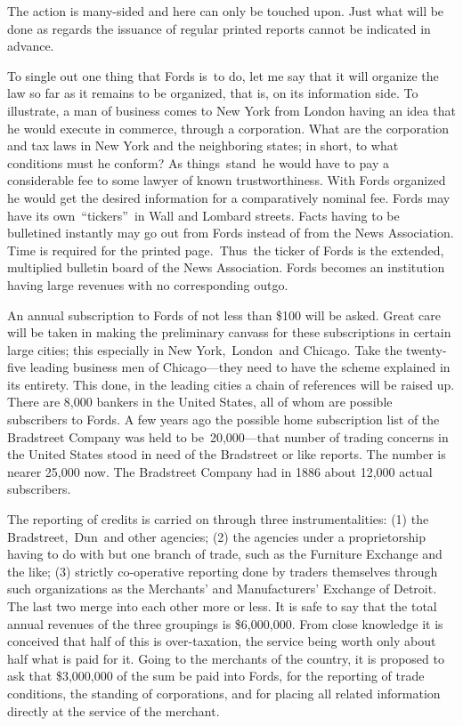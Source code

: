 \documentclass[openany,nobib]{tufte-book}
\begin{document}
The action is many-sided and here can only be touched upon. Just what
will be done as regards the issuance of regular printed reports cannot
be indicated in advance.~

To single out one thing that Fords is~to do, let me say that it will
organize the law so far as it remains to be organized, that is, on its
information side. To illustrate, a man of business comes to New York
from London having an idea that he would execute in commerce, through a
corporation. What are the corporation and tax laws in New York and the
neighboring states; in short, to what conditions must he conform? As
things~stand~he would have to pay a considerable fee to some lawyer of
known trustworthiness. With Fords organized he would get the desired
information for a comparatively nominal fee. Fords may have its
own~``tickers''~in Wall and Lombard streets. Facts having to be
bulletined instantly may go out from Fords instead of from the News
Association. Time is required for the printed page.~Thus~the ticker of
Fords is the extended, multiplied bulletin board of the News
Association. Fords becomes an institution having large revenues with no
corresponding outgo.~

An annual subscription to Fords of not less than \$100 will be asked.
Great care will be taken in making the preliminary canvass for these
subscriptions in certain large cities; this especially in New
York,~London~and Chicago. Take the twenty-five leading business men of
Chicago---they need to have the scheme explained in its entirety. This
done, in the leading cities a chain of references will be raised up.
There are 8,000 bankers in the United States, all of whom are possible
subscribers to Fords. A few years ago the possible home subscription
list of the Bradstreet Company was held to be~20,000---that number of
trading concerns in the United States stood in need of the Bradstreet or
like reports. The number is nearer 25,000 now. The Bradstreet Company
had in 1886 about 12,000 actual subscribers.~

The reporting of credits is carried on through three instrumentalities:
(1) the Bradstreet,~Dun~and other agencies; (2) the agencies under a
proprietorship having to do with but one branch of trade, such as the
Furniture Exchange and the like; (3) strictly co-operative reporting
done by traders themselves through such organizations as the Merchants'
and Manufacturers' Exchange of Detroit. The last two merge into each
other more or less. It is safe to say that the total annual revenues of
the three groupings is \$6,000,000. From close knowledge it is conceived
that half of this is over-taxation, the service being worth only about
half what is paid for it. Going to the merchants of the country, it is
proposed to ask that \$3,000,000 of the sum be paid into Fords, for the
reporting of trade conditions, the standing of corporations, and for
placing all related information directly at the service of the
merchant.~
\end{document}
